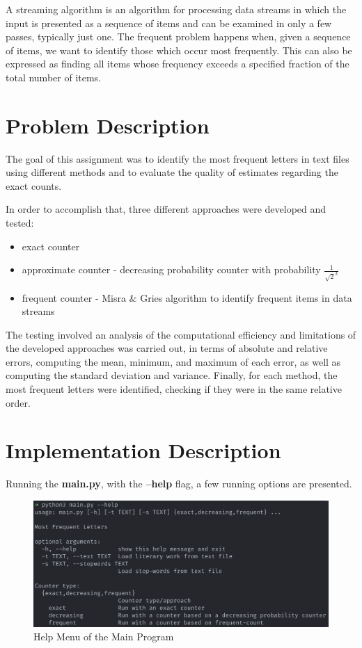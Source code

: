 \documentclass[...]{revdetua}
\begin{document}
A streaming algorithm is an algorithm for processing data streams in which the input is presented as a sequence of items and can be examined in only a few passes, typically just one.
The frequent problem happens when, given a sequence of items, we want to identify those which occur most frequently. This can also be expressed as finding all items whose frequency exceeds a specified fraction of the total number of items.

\section{Problem Description}

The  goal of this assignment was to identify the most frequent letters in text files using different methods and to evaluate the quality of estimates regarding the exact counts.

In order to accomplish that, three different approaches were developed and tested:
\begin{itemize}
    \item exact counter
    \item approximate counter - decreasing probability counter with probability \(\frac{1}{\sqrt{2}^k}\)
    \item frequent counter - Misra \& Gries algorithm to identify frequent items in data streams
\end{itemize} 

The testing involved an analysis of the computational efficiency and limitations of the developed approaches was carried out, in terms of absolute and relative errors, computing the mean, minimum, and maximum of each error, as well as computing the standard deviation and variance.
Finally, for each method, the most frequent letters were identified, checking if they were in the same relative order.

\section{Implementation Description}

Running the \textbf{main.py}, with the \textbf{--help} flag, a few running options are presented.

\begin{figure}[!htb]
    \centering
    \includegraphics[width=1\columnwidth]{./figures/usage}
    \caption{Help Menu of the Main Program}
    \label{fig: Help Menu}
\end{figure}
\end{document}
